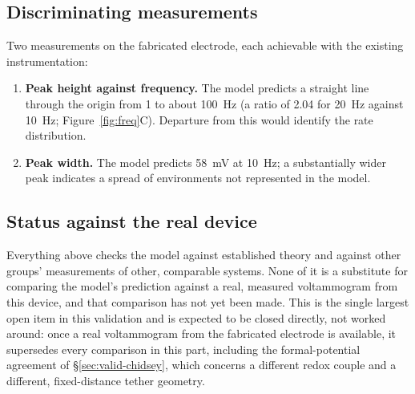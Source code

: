 \documentclass[10pt,a4paper]{article}
\numberwithin{equation}{section}
\newcommand{\figref}[1]{Figure~\ref{#1}}
\newcommand{\fwhmMV}{58}
\newcommand{\ratioTwenty}{2.04}
\begin{document}
\subsection{Discriminating measurements}

Two measurements on the fabricated electrode, each achievable with the existing instrumentation:
\begin{enumerate}[leftmargin=*,noitemsep]
\item \textbf{Peak height against frequency.} The model predicts a straight line through the origin from
  1 to about 100~Hz (a ratio of \ratioTwenty{} for 20~Hz against 10~Hz; \figref{fig:freq}C). Departure from this
  would identify the rate distribution.
\item \textbf{Peak width.} The model predicts \fwhmMV~mV at 10~Hz; a substantially wider peak indicates a
  spread of environments not represented in the model.
\end{enumerate}

\subsection{Status against the real device}
\label{sec:valid-device}

Everything above checks the model against established theory and against other groups' measurements of
other, comparable systems. None of it is a substitute for comparing the model's prediction against a real,
measured voltammogram from this device, and that comparison has not yet been made. This is the single
largest open item in this validation and is expected to be closed directly, not worked around: once a real
voltammogram from the fabricated electrode is available, it supersedes every comparison in this part,
including the formal-potential agreement of \S\ref{sec:valid-chidsey}, which concerns a different redox
couple and a different, fixed-distance tether geometry.
\end{document}
